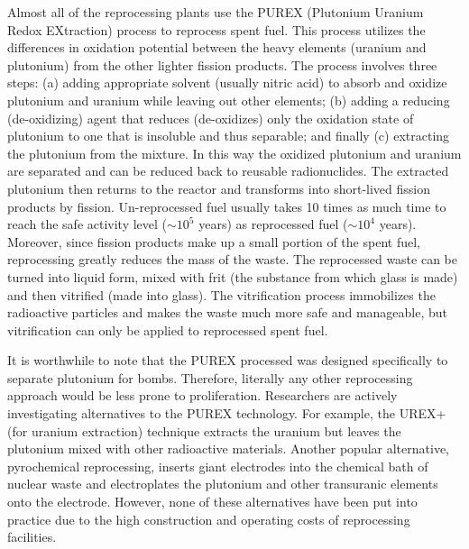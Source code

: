 \documentclass[nofootinbib,preprint,aps]{revtex4-1}
\newcommand{\red}[1]{\textcolor{red}{\bf #1}}
\begin{document}
    Almost all of the reprocessing plants use the PUREX (Plutonium Uranium Redox EXtraction) process
    to reprocess spent fuel. This process utilizes the differences in oxidation potential 
    between the heavy elements (uranium and plutonium) from the other lighter fission products.
    The process involves three steps: (a) adding appropriate solvent (usually nitric acid) to absorb and oxidize 
    plutonium and uranium while leaving out other elements;
    (b) adding a reducing (de-oxidizing) agent that reduces (de-oxidizes) only the
    oxidation state of plutonium to one that is insoluble
    and thus separable; and finally (c) extracting the plutonium from the mixture. In this way
    the oxidized plutonium and uranium are separated and can be reduced back to reusable radionuclides.\cite{lb01} 
    The extracted plutonium then returns to the reactor and transforms into short-lived fission products
    by fission. Un-reprocessed fuel usually takes 10 times as much time to reach the safe
    activity level ($\sim 10^5$ years) as reprocessed fuel ($\sim 10^4$ years). Moreover, since fission products
    make up a small portion of the spent fuel, reprocessing greatly reduces the mass of the waste. The reprocessed
    waste can be turned into liquid form, mixed with frit (the substance from which glass is made) and then
    vitrified (made into glass). The vitrification process immobilizes the radioactive particles and makes
    the waste much more safe and manageable, but vitrification can only be applied to reprocessed spent fuel.

    It is worthwhile to note that the PUREX processed was designed specifically to separate plutonium for
    bombs. Therefore, literally any other reprocessing approach would be less prone to proliferation.
    Researchers are actively investigating alternatives to the PUREX technology. For example, the UREX+ (for
    uranium extraction) technique extracts the uranium but leaves the plutonium mixed with other
    radioactive materials. Another popular alternative, pyrochemical reprocessing, inserts giant electrodes
    into the chemical bath of nuclear waste and electroplates the plutonium and other transuranic elements onto
    the electrode. However, none of these alternatives have been put into practice due to the high construction
    and operating costs of reprocessing facilities.\cite{aa12}

\end{document}
